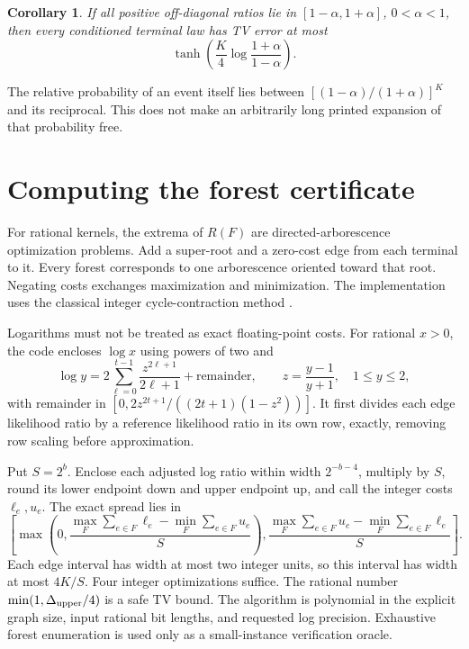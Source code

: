 \documentclass[11pt]{article}
\newtheorem{corollary}{Corollary}
\begin{document}
\begin{corollary}\label{cor:alpha}
If all positive off-diagonal ratios lie in $[1-\alpha,1+\alpha]$,
$0<\alpha<1$, then every conditioned terminal law has TV error at most
\[
 \tanh\left(\frac K4\log\frac{1+\alpha}{1-\alpha}\right).
\]
\end{corollary}

The relative probability of an event itself lies between
$[(1-\alpha)/(1+\alpha)]^K$ and its reciprocal. This does not make
an arbitrarily long printed expansion of that probability free.

\section{Computing the forest certificate}

For rational kernels, the extrema of $R(F)$ are directed-arborescence
optimization problems. Add a super-root and a zero-cost edge from each
terminal to it. Every forest corresponds to one arborescence oriented
toward that root. Negating costs exchanges maximization and minimization.
The implementation uses the classical integer cycle-contraction method
\cite{edmonds}.

Logarithms must not be treated as exact floating-point costs. For rational
$x>0$, the code encloses $\log x$ using powers of two and
\[
 \log y=2\sum_{\ell=0}^{t-1}\frac{z^{2\ell+1}}{2\ell+1}
                +\text{remainder},\qquad
 z=\frac{y-1}{y+1},\quad 1\le y\le2,
\]
with remainder in
$[0,2z^{2t+1}/((2t+1)(1-z^2))]$.
It first divides each edge likelihood ratio by a reference likelihood
ratio in its own row, exactly, removing row scaling before approximation.

Put $S=2^b$. Enclose each adjusted log ratio within width $2^{-b-4}$,
multiply by $S$, round its lower endpoint down and upper endpoint up,
and call the integer costs $\ell_e,u_e$. The exact spread lies in
\[
 \left[
 \max\left(0,\frac{\max_F\sum_{e\in F}\ell_e-
                       \min_F\sum_{e\in F}u_e}{S}\right),
 \frac{\max_F\sum_{e\in F}u_e-\min_F\sum_{e\in F}\ell_e}{S}
 \right].
\]
Each edge interval has width at most two integer units, so this interval
has width at most $4K/S$. Four integer optimizations suffice.
The rational number $\min(1,\Delta_{\rm upper}/4)$ is a safe TV bound.
The algorithm is polynomial in the explicit graph size, input rational
bit lengths, and requested log precision. Exhaustive forest enumeration
is used only as a small-instance verification oracle.
\end{document}
